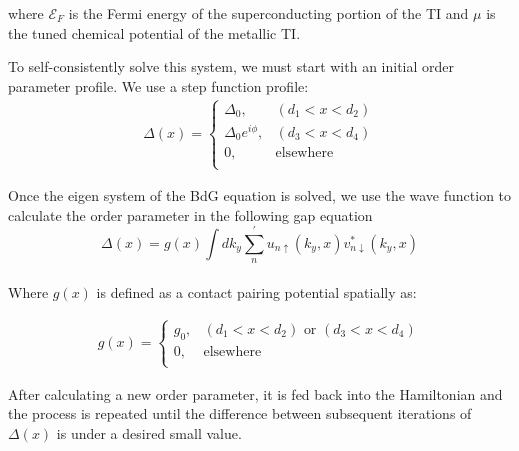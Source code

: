 \documentclass[11pt,revtex,aps]{report}
\begin{document}
where 
$\mathcal{E}_F$ is the Fermi energy of the superconducting portion of the TI and $\mu$ is the tuned chemical potential of the metallic TI.


To self-consistently solve this system, we must start with an initial order parameter profile. We use a step function profile: 
\begin{eqnarray}
\Delta(x)=\left\{
\begin{array}{cc}
\Delta_0,&(d_1<x<d_2)\\
\Delta_0 e^{i\phi},& (d_3<x<d_4)\\
0,& \text{elsewhere}\\
\end{array} \right .
\end{eqnarray}

Once the eigen system of the BdG equation is solved, we use the wave function to calculate the order parameter in the following gap equation
\begin{equation}
\Delta(x)=g(x)\int  d k_y \sum_n^\prime u_{n\uparrow}(k_y, x)v^*_{n\downarrow}(k_y, x)
\end{equation}\label{gap-eq}
\\
Where $g(x)$ is defined as a contact pairing potential spatially as:

\begin{eqnarray}
g(x)=\left\{
\begin{array}{cc}
g_0,&(d_1<x<d_2) \text{ or } (d_3<x<d_4)\\
0,& \text{elsewhere}\\
\end{array} \right .
\end{eqnarray}

After calculating a new order parameter, it is fed back into the Hamiltonian and the process is repeated until the difference between subsequent iterations of $\Delta(x)$ is under a desired small value.
\end{document}
